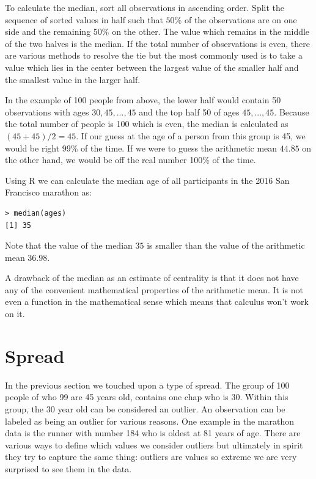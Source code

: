\documentclass{tufte-book} %
\begin{document}
To calculate the median, sort all observations in ascending order. Split the sequence of sorted values in half such that $50\%$ of the observations are on one side and the remaining $50\%$ on the other. The value which remains in the middle of the two halves is the median. If the total number of observations is even, there are various methods to resolve the tie but the most commonly used is to take a value which lies in the center between the largest value of the smaller half and the smallest value in the larger half.

In the example of 100 people from above, the lower half would contain 50 observations with ages $30, 45, ..., 45$ and the top half 50 of ages $45,...,45$. Because the total number of people is 100 which is even, the median is calculated as $(45 + 45) / 2 = 45$. If our guess at the age of a person from this group is 45, we would be right 99\% of the time. If we were to guess the arithmetic mean $44.85$ on the other hand, we would be off the real number 100\% of the time.

Using R we can calculate the median age of all participants in the 2016 San Francisco marathon as:

\begin{Verbatim}
> median(ages)
[1] 35
\end{Verbatim}

Note that the value of the median $35$ is smaller than the value of the arithmetic mean $36.98$.

A drawback of the median as an estimate of centrality is that it does not have any of the convenient mathematical properties of the arithmetic mean. It is not even a function in the mathematical sense which means that calculus won't work on it. 

\section{Spread}

In the previous section we touched upon a type of spread. The group of 100 people of who 99 are 45 years old, contains one chap who is 30. Within this group, the 30 year old can be considered an outlier. An observation can be labeled as being an outlier for various reasons. One example in the marathon data is the runner with number 184 who is oldest at 81 years of age. There are various ways to define which values we consider outliers but ultimately in spirit they try to capture the same thing: outliers are values so extreme we are very surprised to see them in the data.
\end{document}
